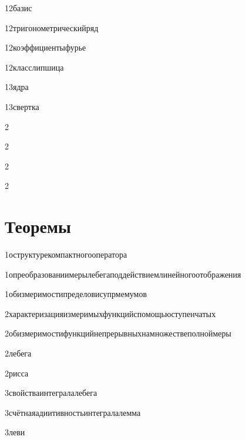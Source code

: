 {12}{базис}

{12}{тригонометрическийряд}

{12}{коэффициентыфурье}

{12}{класслипшица}

{13}{ядра}

{13}{свертка}

{2}{}

{2}{}

{2}{}

{2}{}


\section{Теоремы}

{1}{оструктурекомпактногооператора}

{1}{опреобразованиимерылебегаподдействиемлинейногоотображения}

{1}{обизмеримостипределовисупрмемумов}

{2}{характеризацияизмеримыхфункцийспомощьюступенчатых}

{2}{обизмеримостифункцийнепрерывныхнамножествеполноймеры}

{2}{лебега}

{2}{рисса}

{3}{свойстваинтегралалебега}

{3}{счётнаяадиитивностьинтегралалемма}

{3}{леви}

